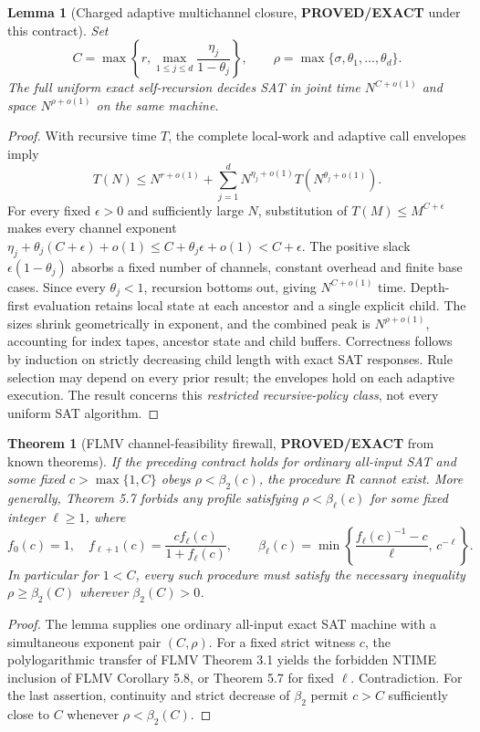 \documentclass[11pt]{article}
\newtheorem{theorem}{Theorem}
\newtheorem{lemma}{Lemma}
\begin{document}
\begin{lemma}[Charged adaptive multichannel closure, \textbf{PROVED/EXACT} under this contract]
Set
\[
 C=\max\!\left\{r,\max_{1\le j\le d}\frac{\eta_j}{1-\theta_j}\right\},
 \qquad
 \rho=\max\{\sigma,\theta_1,\ldots,\theta_d\}.
\]
The full uniform exact self-recursion decides SAT in joint time $N^{C+o(1)}$ and space $N^{\rho+o(1)}$ on the same machine.
\end{lemma}
\begin{proof}
With recursive time $T$, the complete local-work and adaptive call envelopes imply
\[
 T(N)\le N^{r+o(1)}+
   \sum_{j=1}^{d}N^{\eta_j+o(1)}T(N^{\theta_j+o(1)}).
\]
For every fixed $\epsilon>0$ and sufficiently large $N$, substitution of
$T(M)\le M^{C+\epsilon}$ makes every channel exponent
$\eta_j+\theta_j(C+\epsilon)+o(1)
 \le C+\theta_j\epsilon+o(1)<C+\epsilon$.
The positive slack $\epsilon(1-\theta_j)$ absorbs a fixed number of channels, constant overhead and finite base cases. Since every $\theta_j<1$, recursion bottoms out, giving $N^{C+o(1)}$ time. Depth-first evaluation retains local state at each ancestor and a single explicit child. The sizes shrink geometrically in exponent, and the combined peak is
$N^{\rho+o(1)}$, accounting for index tapes, ancestor state and child buffers. Correctness follows by induction on strictly decreasing child length with exact SAT responses. Rule selection may depend on every prior result; the envelopes hold on each adaptive execution. The result concerns this \emph{restricted recursive-policy class}, not every uniform SAT algorithm.
\end{proof}

\begin{theorem}[FLMV channel-feasibility firewall, \textbf{PROVED/EXACT} from known theorems]
If the preceding contract holds for \emph{ordinary all-input SAT} and some fixed $c>\max\{1,C\}$ obeys $\rho<\beta_2(c)$, the procedure $R$ cannot exist. More generally, Theorem 5.7 forbids any profile satisfying $\rho<\beta_\ell(c)$ for some fixed integer $\ell\ge1$, where
\[
 f_0(c)=1,\quad f_{\ell+1}(c)=\frac{c f_\ell(c)}{1+f_\ell(c)},\qquad
 \beta_\ell(c)=\min\!\left\{\frac{f_\ell(c)^{-1}-c}{\ell},\,c^{-\ell}\right\}.
\]
In particular for $1<C$, every such procedure must satisfy the necessary inequality $\rho\ge\beta_2(C)$ wherever $\beta_2(C)>0$.
\end{theorem}
\begin{proof}
The lemma supplies one ordinary all-input exact SAT machine with a simultaneous exponent pair $(C,\rho)$. For a fixed strict witness $c$, the polylogarithmic transfer of FLMV Theorem 3.1 yields the forbidden NTIME inclusion of FLMV Corollary 5.8, or Theorem 5.7 for fixed $\ell$. Contradiction. For the last assertion, continuity and strict decrease of $\beta_2$ permit $c>C$ sufficiently close to $C$ whenever $\rho<\beta_2(C)$.
\end{proof}
\end{document}
